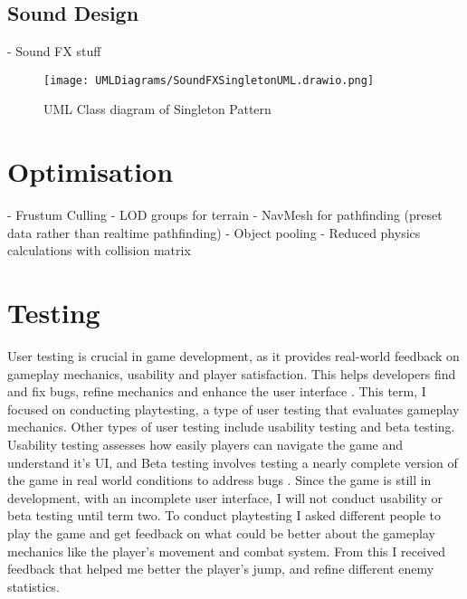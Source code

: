 \documentclass[]{final_report}
\begin{document}
\color{black}

\subsection{Sound Design}


- Sound FX stuff
\begin{figure}[H]
    \centering
    \texttt{[image: UMLDiagrams/SoundFXSingletonUML.drawio.png]}
    \caption{UML Class diagram of Singleton Pattern}
    \label{fig:label_singletonSoundFX}
\end{figure}

\section{Optimisation}
\color{red}
- Frustum Culling\newline
- LOD groups for terrain\newline
- NavMesh for pathfinding (preset data rather than realtime pathfinding)\newline
- Object pooling\newline
- Reduced physics calculations with collision matrix\newline
\color{black}
\section{Testing}\label{testing}
User testing is crucial in game development, as it provides real-world feedback on gameplay mechanics, usability and player satisfaction. This helps developers find and fix bugs, refine mechanics and enhance the user interface \cite{flashjungle_2022}. This term, I focused on conducting playtesting, a type of user testing that evaluates gameplay mechanics. Other types of user testing include usability testing and beta testing. Usability testing assesses how easily players can navigate the game and understand it's UI, and Beta testing involves testing a nearly complete version of the game in real world conditions to address bugs \cite{flashjungle_2022}. Since the game is still in development, with an incomplete user interface, I will not conduct usability or beta testing until term two. To conduct playtesting I asked different people to play the game and get feedback on what could be better about the gameplay mechanics like the player's movement and combat system. From this I received feedback that helped me better the player's jump, and refine different enemy statistics.
\end{document}
